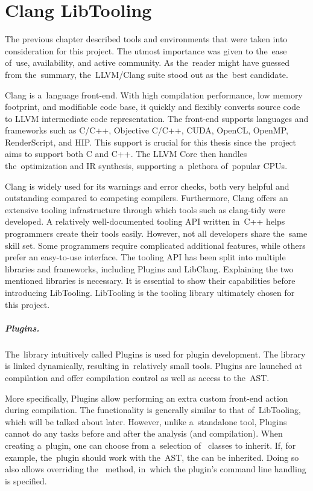 \chapter{Clang LibTooling}

The previous chapter described tools and environments that were taken
into consideration for this project. 
The utmost importance was given to the~ease of~use, availability, and 
active community. 
As the~reader might have guessed from the~summary, the~LLVM/Clang 
suite stood out as the~best candidate.

Clang is a~language front-end. With high compilation performance, 
low memory footprint, and modifiable code base, it quickly and flexibly 
converts source code to LLVM intermediate code representation. 
The front-end supports languages and frameworks such as C/C++, 
Objective C/C++, CUDA, OpenCL, OpenMP, RenderScript, and HIP. 
This support is crucial for this thesis since the~project 
aims to support both C and C++. 
The LLVM Core then handles the~optimization and IR synthesis, 
supporting a~plethora of~popular CPUs.

Clang is widely used for its warnings and error checks, both very 
helpful and outstanding compared to competing compilers. 
Furthermore, Clang offers an extensive tooling infrastructure 
through which tools such as clang-tidy were developed. 
A relatively well-documented tooling API written in~C++ helps 
programmers create their tools easily. 
However, not all developers share the~same skill set. 
Some programmers require complicated additional features, while others 
prefer an easy-to-use interface. 
The tooling API has been split into multiple libraries and frameworks,
including Plugins and LibClang.
Explaining the two mentioned libraries is necessary. 
It is essential to show their capabilities before introducing LibTooling. 
LibTooling is the tooling library ultimately chosen for this project.

\paragraph{Plugins.}

The~library intuitively called Plugins is used for plugin development.
The library is linked dynamically, resulting in~relatively small tools.
Plugins are launched at compilation and offer compilation control as well 
as access to the~AST.

More specifically, Plugins allow performing an extra custom front-end action 
during compilation.
The functionality is generally similar to that of~LibTooling, which will be 
talked about later.
However, unlike a~standalone tool, Plugins cannot do any tasks before and after 
the analysis (and compilation).
When creating a~plugin, one can choose from a~selection of~
 classes to inherit.
If, for example, the~plugin should work with the~AST, 
the  can be inherited.
Doing so also allows overriding the~ method, in~which 
the plugin's command line handling is specified.

